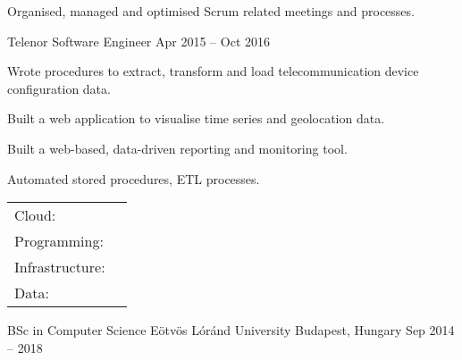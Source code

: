 \documentclass[]{awesome-cv}
\begin{document}
\begin{cventries}
{\begin{cvitems}
		\item {Organised, managed and optimised Scrum related meetings and processes.}
		\end{cvitems}}
	\cventry
	{Telenor}
	{Software Engineer}
	{Apr 2015 – Oct 2016}
	{}
	{\begin{cvitems}
		\item {Wrote procedures to extract, transform and load telecommunication device configuration data.}
		\item {Built a web application to visualise time series and geolocation data.}
		\item {Built a web-based, data-driven reporting and monitoring tool.}
		\item {Automated stored procedures, ETL processes.}
		\end{cvitems}}
\end{cventries}
\begin{cventries}
	\cventry
	{}
	{\def\arraystretch{1.15}{\begin{tabular}{ l l }
	 	Cloud:  & {\skill{ BigQuery, Composer, GKE, Cloud Functions, Cloud Build, Pub/Sub, GCS, etc. }} \\
		Programming:  & {\skill{ Python (pandas, airflow, luigi, scikit, etc.), SQL, bash, Go, HTML/JS/CSS3 }} \\
		Infrastructure:  & {\skill{ Docker, Kubernetes, CI/CD, Google Cloud Platform, GNU/Linux }} \\
		Data: & {\skill{ Data modeling, ETL processes, database schema design, object storages }} \\
		\end{tabular}}}
	{}
	{}
	{}
\end{cventries}

\begin{cventries}
	\cventry
	{BSc in Computer Science}
	{Eötvös Lóránd University}
	{Budapest, Hungary}
	{Sep 2014 – 2018}
	{}
\end{cventries}

\vspace{-2mm}
\ 
\end{document}
